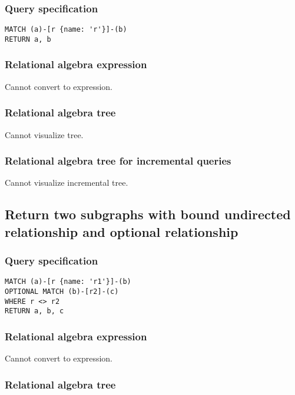 \subsubsection*{Query specification}

\begin{lstlisting}
MATCH (a)-[r {name: 'r'}]-(b)
RETURN a, b
\end{lstlisting}

\subsubsection*{Relational algebra expression}

Cannot convert to expression.

\subsubsection*{Relational algebra tree}

Cannot visualize tree.

\subsubsection*{Relational algebra tree for incremental queries}

Cannot visualize incremental tree.

\subsection{Return two subgraphs with bound undirected relationship and optional relationship}

\subsubsection*{Query specification}

\begin{lstlisting}
MATCH (a)-[r {name: 'r1'}]-(b)
OPTIONAL MATCH (b)-[r2]-(c)
WHERE r <> r2
RETURN a, b, c
\end{lstlisting}

\subsubsection*{Relational algebra expression}

Cannot convert to expression.

\subsubsection*{Relational algebra tree}

